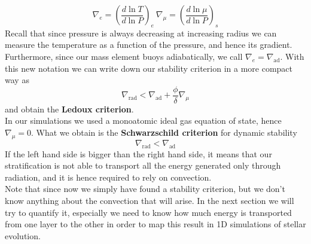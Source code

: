 \begin{equation}\label{nablas}
	\nabla_{e} = \left (  \frac{d \ln T}{d \ln P}   \right )_e \  \nabla_{\mu} = \left (  \frac{d \ln \mu}{d \ln P}   \right )_s
\end{equation}
Recall that since pressure is always decreasing at increasing radius we can measure the temperature as a function of the pressure, and hence its gradient. Furthermore, since our mass element buoys adiabatically, we call $\nabla_e=\nabla_{\mathrm{ad}}$. 
With this new notation we can write down our stability criterion in a more compact way as
\begin{equation}\label{stabcritcomp}
	\nabla_{\mathrm{rad}} < \nabla_{\mathrm{ad}} + \frac{\phi}{\delta} \nabla_{\mu}
\end{equation}
and obtain the \textbf{Ledoux criterion}. \\
In our simulations we used a monoatomic ideal gas equation of state, hence $\nabla_{\mu}=0$.  What we obtain is the \textbf{Schwarzschild criterion} for dynamic stability
\begin{equation}\label{schwarzschild}
	\nabla_{\mathrm{rad}}<\nabla_{\mathrm{ad}}
\end{equation}
If the left hand side is bigger than the right hand side, it means that our stratification is not able to transport all the energy generated only through radiation, and it is hence required to rely on convection. \\
Note that since now we simply have found a stability criterion, but we don't know anything about the convection that will arise. In the next section we will try to quantify it, especially we need to know how much energy is transported from one layer to the other in order to map this result in 1D simulations of stellar evolution.

